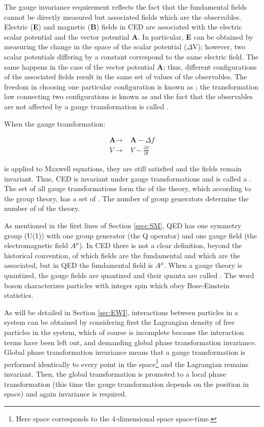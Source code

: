 The gauge invariance requirement reflects the fact that the fundamental fields cannot be directly measured but associated fields which are the observables. Electric (\textbf{E}) and magnetic (\textbf{B}) fields in CED are associated with the electric scalar potential  and the vector potential \textbf{A}. In particular, \textbf{E} can be obtained by measuring the change in the space of the scalar potential (\textbf{$\Delta$}V); however, two scalar potentials differing by a constant  correspond to the same electric field. The same happens in the case of the vector potential \textbf{A}; thus, different configurations of the associated fields result in the same set of values of the observables. The freedom in choosing one particular configuration is known as ; the transformation law connecting two configurations is known as  and the fact that the observables are not affected by a gauge transformation is called .

When the gauge transformation:  

\begin{align}\label{cov_der}
\textbf{A} \to &\textbf{A} -\Delta f\nonumber\\
V \to & V - \frac{\partial f}{\partial t}
\end{align}

\noindent is applied to Maxwell equations, they are still satisfied and the fields remain invariant. Thus, CED is invariant under gauge transformations and is called a . The set of all gauge transformations form the  of the theory, which according to the group theory, has a set of . The number of group generators determine the number of  of the theory.

As mentioned in the first lines of Section \ref{secc:SM}, QED has one symmetry group (U(1)) with one group generator (the Q operator) and one gauge field (the electromagnetic field $A^\mu$). In CED there is not a clear definition, beyond the historical convention, of which fields are the fundamental and which are the associated, but in QED the fundamental field is $A^\mu$. When a gauge theory is quantized, the gauge fields are quantized and their quanta are called . The word boson characterizes particles with integer spin which obey Bose-Einstein statistics.     

As will be detailed in Section \ref{sec:EWI}, interactions between particles in a system can be obtained by considering first the Lagrangian density of free particles in the system, which of course is incomplete because the interaction terms have been left out, and demanding global phase transformation invariance. Global phase transformation invariance means that a gauge transformation is performed identically to every point in the space\footnote{Here space corresponds to the 4-dimensional space \ie space-time.} and the Lagrangian remains invariant. Then, the global transformation is promoted to a local phase transformation (this time the gauge transformation depends on the position in space) and again invariance is required.

